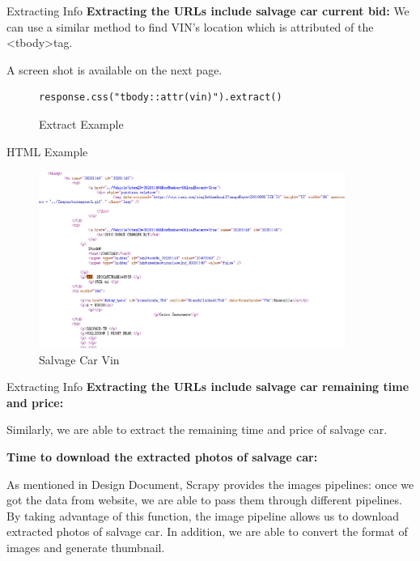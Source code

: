 \documentclass{beamer}
\begin{document}
\begin{frame}[fragile=singleslide]{Extracting Info}
\textbf{Extracting the URLs include salvage car current bid:}
We can use a similar method to find VIN's location which is attributed of the  \textless tbody\textgreater  tag.

A screen shot is available on the next page.

\begin{figure}[ht]
\begin{itemize}
\begin{verbatim}
response.css("tbody::attr(vin)").extract()
\end{verbatim}
\end{itemize}
\caption{Extract Example}
\end{figure}


\end{frame}

\begin{frame}{HTML Example}

\begin{figure}[ht]
\centering
\includegraphics[width=100mm]{salvagecarvin}
\caption{Salvage Car Vin}
\label{fig:vin}
\end{figure}

\end{frame}

\begin{frame}{Extracting Info}
\textbf{Extracting the URLs include salvage car remaining time and price:}

Similarly, we are able to extract the remaining time and price of salvage car.

\textbf{Time to download the extracted photos of salvage car:}

As mentioned in Design Document, Scrapy provides the images pipelines: once we got the data from website, we are able to pass them through different pipelines. By taking advantage of this function, the image pipeline allows us to download extracted photos of salvage car. In addition, we are able to convert the format of images and generate thumbnail.
\end{frame}
\end{document}
